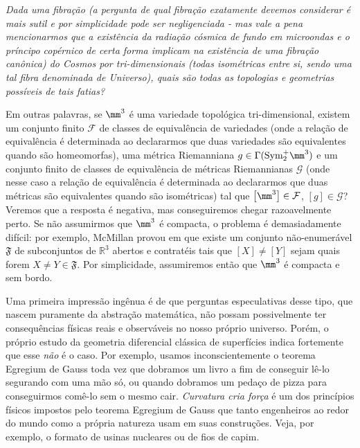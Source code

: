 \begin{pergunta}\label{FibUniverso}
\textit{Dada uma fibração (a pergunta de qual fibração exatamente devemos considerar é mais sutil e por simplicidade pode ser negligenciada - mas vale a pena mencionarmos que a existência da radiação cósmica de fundo em microondas e o príncipo copérnico de certa forma implicam na existência de uma fibração canônica) do Cosmos por  tri-dimensionais (todas isométricas entre si, sendo uma tal fibra denominada de Universo), quais são todas as topologias e geometrias possíveis de tais fatias?}
\end{pergunta} 
 \par Em outras palavras, se $\mm^3$ é uma variedade topológica tri-dimensional, existem um conjunto finito $\mathcal{F}$  de classes de equivalência de variedades (onde a relação de equivalência é determinada ao declararmos que duas variedades são equivalentes quando são homeomorfas), uma métrica Riemanniana $g \in \Gamma(\text{Sym}_2^{+} \mm^3)$ e um conjunto finito de classes de equivalência de métricas Riemannianas $\mathcal{G}$ (onde nesse caso a relação de equivalência é determinada ao declararmos que duas métricas são equivalentes quando são isométricas) tal que $\left[\mm^3 \right] \in \mathcal{F}$, $[g] \in \mathcal{G}$? Veremos que a resposta é negativa, mas conseguiremos chegar razoavelmente perto. Se não assumirmos que $\mm^3$ é compacta, o problema é demasiadamente difícil: por exemplo, McMillan provou em  que existe um conjunto não-enumerável $\mathfrak{F}$ de subconjuntos de $\mathbb{R}^3$ abertos e contratéis tais que $[X] \neq [Y]$ sejam quais forem $X \neq Y \in \mathfrak{F}$. Por simplicidade, assumiremos então que $\mm^3$ é compacta e sem bordo.  \par
 Uma primeira impressão ingênua é de que perguntas especulativas desse tipo, que nascem puramente da abstração matemática, não possam possivelmente ter consequências físicas reais e observáveis no nosso próprio universo. Porém, o próprio estudo da geometria diferencial clássica de superfícies indica fortemente que esse \emph{não} é o caso. Por exemplo, usamos inconscientemente o teorema Egregium de Gauss toda vez que dobramos um livro a fim de conseguir lê-lo segurando com uma mão só, ou quando dobramos um pedaço de pizza para conseguirmos comê-lo sem o mesmo cair. \emph{Curvatura cria força} é um dos princípios físicos impostos pelo teorema Egregium de Gauss que tanto engenheiros ao redor do mundo como a própria natureza usam em suas construções. Veja, por exemplo, o formato de usinas nucleares ou de fios de capim.  \par
